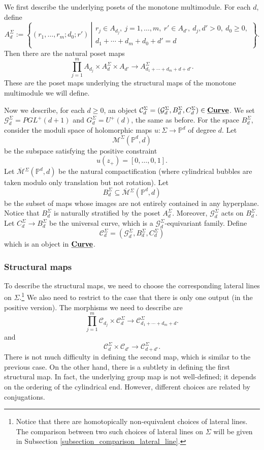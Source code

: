 \documentclass[reqno, 10pt]{amsart}
\numberwithin{equation}{section}
\numberwithin{equation}{section}
\renewcommand{\subset}{\subseteq}
\theoremstyle{definition}
\theoremstyle{remark}
\newcommand{\beqn}{\begin{equation*}}
\newcommand{\eeqn}{\end{equation*}}
\newcommand{\ov}{\overline}
\newcommand{\mb}{\mathbb}
\newcommand{\mc}{\mathcal}
\newcommand{\uds}[1]{\underline{\smash{#1}}}
\begin{document}
We first describe the underlying posets of the monotone multimodule. For each $d$, define
\beqn
A_d^\Sigma:= \left\{ (r_1, \ldots, r_m; d_0; r')\ \left| \begin{array}{c} r_j \in A_{d_j},\ j = 1, \ldots, m,\ r' \in A_{d'},\ d_j, d'  > 0,\ d_0 \geq 0,\\
d_1 + \cdots + d_m + d_0 + d' = d 
\end{array} \right.\right\}.
\eeqn
Then there are the natural poset maps
\beqn
\prod_{j=1}^m A_{d_j} \times A_d^\Sigma \times A_{d'} \to A_{d_1 + \cdots + d_m + d + d'}^\Sigma.
\eeqn
These are the poset maps underlying the structural maps of the monotone multimodule we will define. 

Now we describe, for each $d \geq 0$, an object ${\mc C}_d^\Sigma = ({\mc G}_d^\Sigma, B_d^\Sigma, C_d^\Sigma) \in \uds{\bf Curve}$. We set ${\mc G}_d^\Sigma = PGL^+(d+1)$ and $G_d^\Sigma = U^+(d)$, the same as before. For the space $B_d^\Sigma$, consider the moduli space of holomorphic maps $u: \Sigma \to \mb{P}^d$ of degree $d$. Let 
\beqn
{\mc M}^\Sigma({\mb P}^d, d)
\eeqn
be the subspace satisfying the positive constraint
\beqn
u  (z_+) = [0, \ldots, 0, 1].
\eeqn
Let $\ov{\mc M}{}^\Sigma({\mb P}^d, d)$ be the natural compactification (where cylindrical bubbles are taken modulo only translation but not rotation). Let 
\beqn
B^\Sigma_d \subset \ov{\mc M}{}^\Sigma(\mb{P}^d, d)
\eeqn
be the subset of maps whose images are not entirely contained in any hyperplane. Notice that $B_d^\Sigma$ is naturally stratified by the poset $A_d^\Sigma$. Moreover, ${\mc G}_d^\Sigma$ acts on $B_d^\Sigma$. Let $C_d^\Sigma \to B_d^\Sigma$ be the universal curve, which is a ${\mc G}_d^\Sigma$-equivariant family. Define
\beqn
{\mc C}_d^\Sigma = ({\mc G}_d^\Sigma, B_d^\Sigma, C_d^\Sigma)
\eeqn
which is an object in $\uds{\bf Curve}$.

\subsubsection{Structural maps}

To describe the structural maps, we need to choose the corresponding lateral lines on $\Sigma$.\footnote{Notice that there are homotopically non-equivalent choices of lateral lines. The comparison between two such choices of lateral lines on $\Sigma$ will be given in Subsection \ref{subsection_comparison_lateral_line}.} We also need to restrict to the case that there is only one output (in the positive version). The morphisms we need to describe are
\beqn
\prod_{j=1}^m {\mc C}_{d_j} \times {\mc C}_d^\Sigma  \to {\mc C}_{d_1 + \cdots + d_m + d}^\Sigma.
\eeqn
and 
\beqn
{\mc C}_d^\Sigma \times {\mc C}_{d'} \to {\mc C}_{d +d'}^\Sigma.
\eeqn
There is not much difficulty in defining the second map, which is similar to the previous case. On the other hand, there is a subtlety in defining the first structural map. In fact, the underlying group map is not well-defined; it depends on the ordering of the cylindrical end. However, different choices are related by conjugations. 
\end{document}

